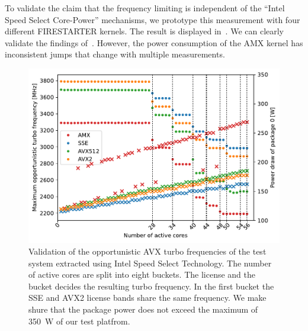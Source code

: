 To validate the claim that the frequency limiting is independent of the ``Intel Speed Select Core-Power'' mechanisms, we prototype this measurement with four different FIRESTARTER kernels.
The result is displayed in~. We can clearly validate the findings of~.
However, the power consumption of the AMX kernel has inconsistent jumps that change with multiple measurements.




\begin{figure}[]
    \centering
    \includegraphics[width=0.8\columnwidth]{fig/validate-avx-frequency-license-bands.pdf}
    \caption{\label{fig:validated-p0n-frequencies}Validation of the opportunistic AVX turbo frequencies of the test system extracted using Intel Speed Select Technology.
    The number of active cores are split into eight buckets. The license and the bucket decides the resulting turbo frequency.
    In the first bucket the SSE and AVX2 license bands share the same frequency. We make shure that the package power does not exceed the maximum of \SI{350}{\watt} of our test platfrom.}
\end{figure}




